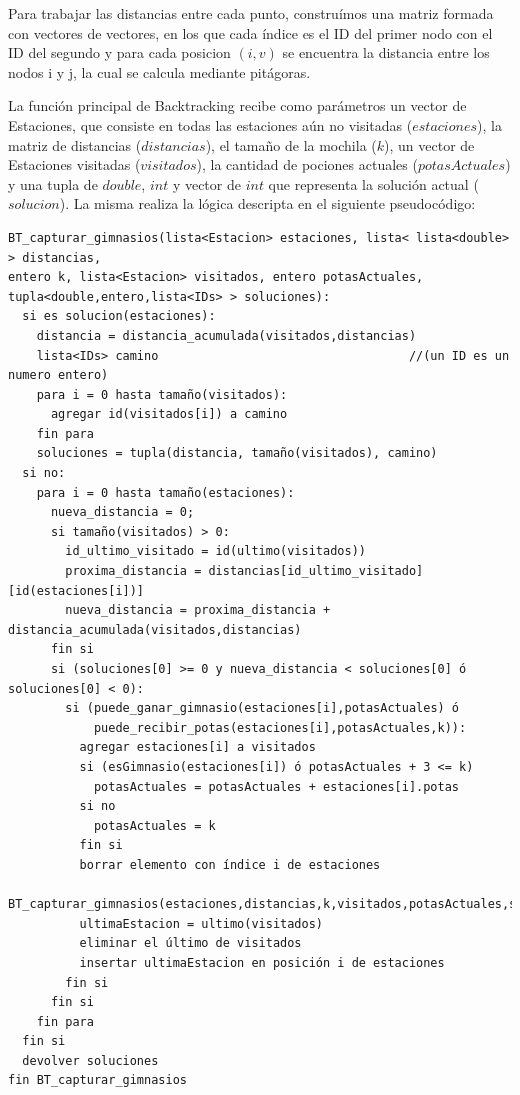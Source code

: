             Para trabajar las distancias entre cada punto, construímos una matriz formada con vectores de vectores, en los que cada índice es el ID del primer nodo con el ID del segundo y para cada posicion $(i,v)$ se encuentra la distancia entre los nodos i y j, la cual se calcula mediante pitágoras.

            La función principal de Backtracking recibe como parámetros un vector de Estaciones, que consiste en todas las estaciones aún no visitadas ($estaciones$), la matriz de distancias ($distancias$), el tamaño de la mochila ($k$), un vector de Estaciones visitadas ($visitados$), la cantidad de pociones actuales ($potasActuales$) y una tupla de $double$, $int$ y vector de $int$ que representa la solución actual ($solucion$). La misma realiza la lógica descripta en el siguiente pseudocódigo:

            \begin{codesnippet}
            \begin{verbatim}
BT_capturar_gimnasios(lista<Estacion> estaciones, lista< lista<double> > distancias,
entero k, lista<Estacion> visitados, entero potasActuales,
tupla<double,entero,lista<IDs> > soluciones):
  si es solucion(estaciones):
    distancia = distancia_acumulada(visitados,distancias)
    lista<IDs> camino                                   //(un ID es un numero entero)
    para i = 0 hasta tamaño(visitados):
      agregar id(visitados[i]) a camino
    fin para
    soluciones = tupla(distancia, tamaño(visitados), camino)
  si no:
    para i = 0 hasta tamaño(estaciones):
      nueva_distancia = 0;
      si tamaño(visitados) > 0:
        id_ultimo_visitado = id(ultimo(visitados))
        proxima_distancia = distancias[id_ultimo_visitado][id(estaciones[i])]
        nueva_distancia = proxima_distancia + distancia_acumulada(visitados,distancias)
      fin si
      si (soluciones[0] >= 0 y nueva_distancia < soluciones[0] ó soluciones[0] < 0):
        si (puede_ganar_gimnasio(estaciones[i],potasActuales) ó
            puede_recibir_potas(estaciones[i],potasActuales,k)):
          agregar estaciones[i] a visitados
          si (esGimnasio(estaciones[i]) ó potasActuales + 3 <= k)
            potasActuales = potasActuales + estaciones[i].potas
          si no
            potasActuales = k
          fin si
          borrar elemento con índice i de estaciones
          BT_capturar_gimnasios(estaciones,distancias,k,visitados,potasActuales,soluciones)
          ultimaEstacion = ultimo(visitados)
          eliminar el último de visitados
          insertar ultimaEstacion en posición i de estaciones
        fin si
      fin si
    fin para
  fin si
  devolver soluciones
fin BT_capturar_gimnasios
            \end{verbatim}
            \end{codesnippet}

